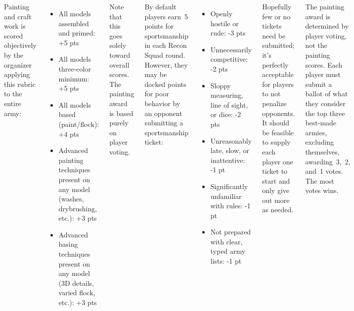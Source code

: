\begin{columns}
Painting and craft work is scored objectively by the organizer
applying this rubric to the entire army:

\begin{itemize}\shortlist
\item All models assembled and primed: \hfill +5 pts
\item All models three-color minimum: \hfill +5 pts
\item All models based (paint/flock): \hfill +4 pts
\item Advanced painting techniques present on any model (washes,
  drybrushing, etc.): \hfill +3 pts
\item Advanced basing techniques present on any model (3D details,
  varied flock, etc.): \hfill +3 pts
\end{itemize}

Note that this goes solely toward overall scores.  The painting award
is based purely on player voting.





By default players earn~5 points for sportsmanship in each Recon Squad
round.  However, they may be docked points for poor behavior by an
opponent submitting a sportsmanship ticket:

\begin{itemize}\shortlist\setlength{\parskip}{0pt}\setlength{\itemsep}{2pt}
\item Openly hostile or rude: \hfill -3 pts
\item Unnecessarily competitive: \hfill -2 pts
\item Sloppy measuring, line of sight, or dice: \hfill -2 pts
\item Unreasonably late, slow, or inattentive: \hfill -1 pt
\item Significantly unfamiliar with rules:
  \hfill -1 pt
\item Not prepared with clear, typed army lists: \hfill -1 pt
\end{itemize}

Hopefully few or no tickets need be submitted; it's perfectly
acceptable for players to not penalize opponents.  It should be
feasible to supply each player one ticket to start and only give out
more as needed.

  The painting award is determined
by player voting, not the painting scores.  Each player must submit a
ballot of what they consider the top three best-made armies, excluding
themselves, awarding~3,~2, and~1 votes.  The most votes wins.

\end{columns}

